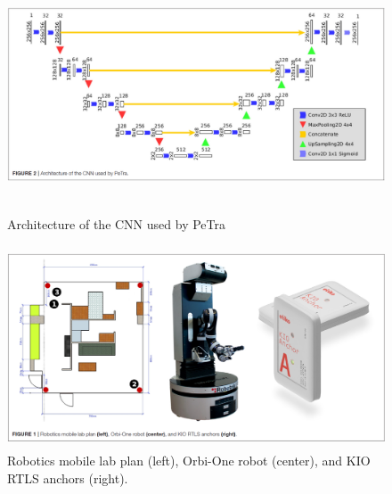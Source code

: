 \begin{figure}[h]
  \begin{center}
  \includegraphics[height=70mm,clip]{figure/2-4_cnn.png}
  \caption{Architecture of the CNN used by PeTra
  \cite{Tracking People in a Mobile Robot From 2D LIDAR Scans Using Full Convolutional Neural Networks for Security in Cluttered Environments}}
  \label{2-4_cnn}
  \end{center}
\end{figure}

\begin{figure}[h]
  \begin{center}
  \includegraphics[height=60mm,clip]{figure/2-4_env.png}
  \caption{Robotics mobile lab plan (left), Orbi-One robot (center), and KIO RTLS anchors (right).
  \cite{Tracking People in a Mobile Robot From 2D LIDAR Scans Using Full Convolutional Neural Networks for Security in Cluttered Environments}}
  \label{2-4_env}
  \end{center}
\end{figure}

